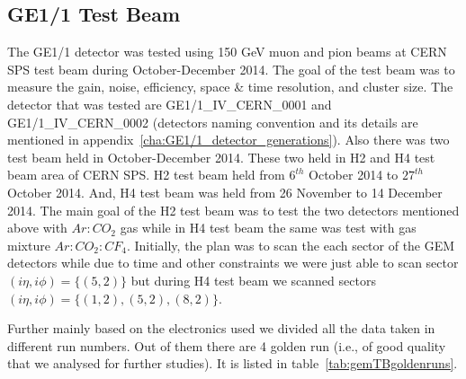 
\subsection{GE1/1 Test Beam}
The GE1/1 detector was tested using 150 GeV muon and pion beams at CERN SPS test beam during October-December 2014. 
The goal of the test beam was to measure the gain, noise, efficiency, space \& time resolution, and cluster size. 
The detector that was tested are GE1/1\_IV\_CERN\_0001 and GE1/1\_IV\_CERN\_0002 (detectors naming convention and its details are mentioned in appendix~\ref{cha:GE1/1_detector_generations}).
Also there was two test beam held in October-December 2014. These two held in H2 and H4 test beam area of CERN SPS.
H2 test beam held from $6^{th}$ October 2014 to $27^{th}$ October 2014. And, H4 test beam was held from 26 November to 14 December 2014.
The main goal of the H2 test beam was to test the two detectors mentioned above with $Ar:CO_2$ gas while in H4 test beam the same was test with gas mixture $Ar:CO_2:CF_4$.
Initially, the plan was to scan the each sector of the GEM detectors while due to time and other constraints we were just able to scan sector $(i\eta, i\phi)=\{(5,2)\}$ but during H4 test beam we scanned sectors $(i\eta,i\phi)=\{(1,2),(5,2),(8,2)\}$.  

Further mainly based on the electronics used we divided all the data taken in different run numbers. Out of them there are 4 golden run (i.e., of good quality that we analysed for further studies). It is listed in table~\ref{tab:gemTBgoldenruns}.

